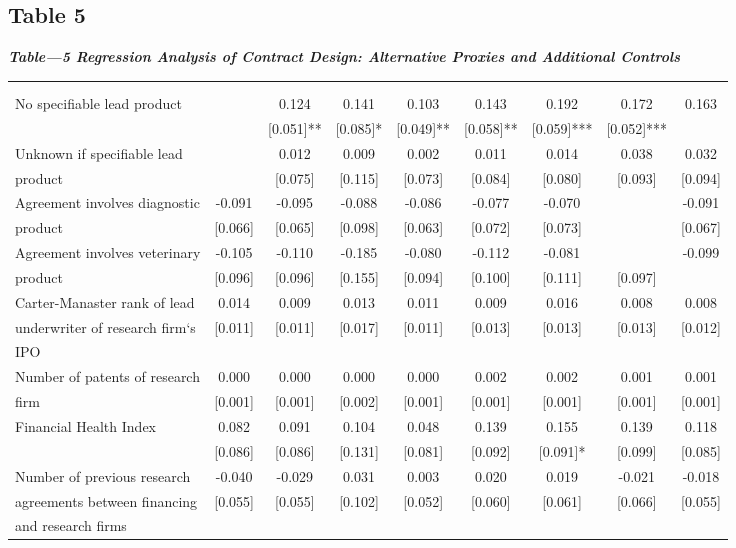 \subsection{Table 5}
\textbf{\textit{Table---5 Regression Analysis of Contract Design: Alternative Proxies and Additional Controls}} \\
\begin{tabular}{lcccccccc}
 \hline \hline
\\
\\ \hline
No specifiable lead product&&0.124&0.141&0.103&0.143&0.192&0.172&0.163\\
&&[0.051]**&[0.085]*&[0.049]**&[0.058]**&[0.059]***&[0.052]***\\
Unknown if specifiable lead&&0.012&0.009&0.002&0.011&0.014&0.038&0.032\\
\quad product&&[0.075]& [0.115]& [0.073] &[0.084]& [0.080]& [0.093] &[0.094]\\
Agreement involves diagnostic & -0.091& -0.095& -0.088& -0.086& -0.077 &-0.070 &&-0.091\\
\quad product&[0.066] &[0.065] &[0.098] &[0.063]& [0.072] &[0.073] &&[0.067] \\
Agreement involves veterinary&-0.105 &-0.110 &-0.185 &-0.080 &-0.112 &-0.081 &&-0.099\\
\quad product&[0.096] &[0.096]& [0.155] &[0.094] &[0.100] &[0.111] &[0.097] \\
Carter-Manaster rank of lead&0.014 &0.009& 0.013 &0.011 &0.009 &0.016 &0.008 &0.008\\
\quad underwriter of research firm`s&[0.011]& [0.011] &[0.017]& [0.011]& [0.013]& [0.013] &[0.013] &[0.012] \\
\quad IPO \\
Number of patents of research &0.000 &0.000 &0.000& 0.000 &0.002 &0.002& 0.001 &0.001\\
\quad firm&[0.001]& [0.001] &[0.002] &[0.001] &[0.001] &[0.001] &[0.001] &[0.001] \\
Financial Health Index&0.082& 0.091 &0.104& 0.048 &0.139 &0.155 &0.139 &0.118\\
&[0.086] &[0.086] &[0.131] &[0.081]& [0.092] &[0.091]*& [0.099] &[0.085]\\
Number of previous research&-0.040 &-0.029 &0.031 &0.003 &0.020 &0.019 &-0.021 &-0.018\\
\quad agreements between financing&[0.055]& [0.055] &[0.102] &[0.052]& [0.060] &[0.061] &[0.066] &[0.055]\\
\quad and research firms\\

\end{tabular}
